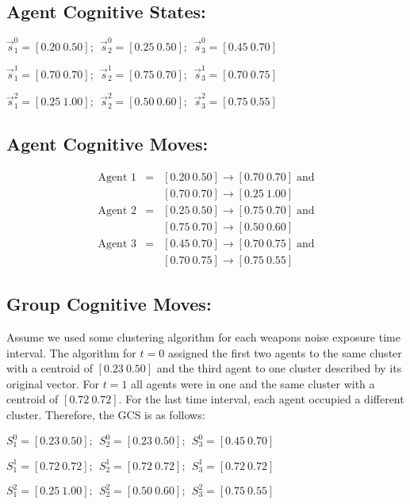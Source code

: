 \documentclass[conference]{IEEEtran}
\begin{document}
\subsection{Agent Cognitive States:}

$\vec{s}^0_1 = [0.20 \ 0.50]; \ \ \vec{s}^0_2 = [0.25 \ 0.50]; \ \ \vec{s}^0_3 = [0.45 \ 0.70]$

$\vec{s}^1_1 = [0.70 \ 0.70]; \ \ \vec{s}^1_2 = [0.75 \ 0.70]; \ \ \vec{s}^1_3 = [0.70 \ 0.75]$

$\vec{s}^2_1 = [0.25 \ 1.00]; \ \ \vec{s}^2_2 = [0.50 \ 0.60]; \ \ \vec{s}^2_3 = [0.75 \ 0.55]$

\subsection{Agent Cognitive Moves:}
\begin{eqnarray*}
\mbox{Agent 1} & = & [0.20 \ 0.50] \rightarrow [0.70 \ 0.70] \; \mbox{and}\\
               &   & [0.70 \ 0.70] \rightarrow [0.25 \ 1.00]\\
\mbox{Agent 2} & = & [0.25 \ 0.50] \rightarrow [0.75 \ 0.70] \; \mbox{and}\\
               &   & [0.75 \ 0.70] \rightarrow [0.50 \ 0.60]\\
\mbox{Agent 3} & = & [0.45 \ 0.70] \rightarrow [0.70 \ 0.75] \; \mbox{and}\\
               &   & [0.70 \ 0.75] \rightarrow [0.75 \ 0.55]
\end{eqnarray*}

\subsection{Group Cognitive Moves:}

Assume we used some clustering algorithm for each weapons noise exposure time interval. The
algorithm for $t=0$ assigned the first two agents to the same cluster with a centroid of $[0.23 \
0.50]$ and the third agent to one cluster described by its original vector. For $t=1$ all agents
were in one and the same cluster with a centroid of $[0.72 \ 0.72]$. For the last time interval,
each agent occupied a different cluster. Therefore, the GCS is as follows:

$S^0_1 = [0.23 \ 0.50]; \ \ S^0_2 = [0.23 \ 0.50]; \ \ S^0_3 = [0.45 \ 0.70]$

$S^1_1 = [0.72 \ 0.72]; \ \ S^1_2 = [0.72 \ 0.72]; \ \ S^1_3 = [0.72 \ 0.72]$

$S^2_1 = [0.25 \ 1.00]; \ \ S^2_2 = [0.50 \ 0.60]; \ \ S^2_3 = [0.75 \ 0.55]$
\end{document}
